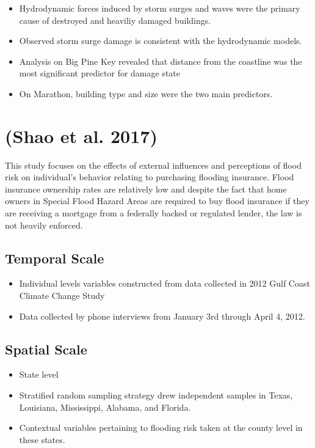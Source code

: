 \documentclass[
]{article}
\providecommand{\tightlist}{%
  \setlength{\itemsep}{0pt}\setlength{\parskip}{0pt}}
\begin{document}
\begin{itemize}
\tightlist
\item
  Hydrodynamic forces induced by storm surges and waves were the primary
  cause of destroyed and heaviliy damaged buildings.
\item
  Observed storm surge damage is consistent with the hydrodynamic
  models.
\item
  Analysis on Big Pine Key revealed that distance from the coastline was
  the most significant predictor for damage state
\item
  On Marathon, building type and size were the two main predictors.
\end{itemize}

\hypertarget{shao2017understanding}{%
\section{(Shao et al. 2017)}\label{shao2017understanding}}

This study focuses on the effects of external influences and perceptions
of flood risk on individual's behavior relating to purchasing flooding
insurance. Flood insurance ownership rates are relatively low and
despite the fact that home owners in Special Flood Hazard Areas are
required to buy flood insurance if they are receiving a mortgage from a
federally backed or regulated lender, the law is not heavily enforced.

\hypertarget{temporal-scale-26}{%
\subsection{Temporal Scale}\label{temporal-scale-26}}

\begin{itemize}
\tightlist
\item
  Individual levels variables constructed from data collected in 2012
  Gulf Coast Climate Change Study
\item
  Data collected by phone interviews from January 3rd through April 4,
  2012.
\end{itemize}

\hypertarget{spatial-scale-26}{%
\subsection{Spatial Scale}\label{spatial-scale-26}}

\begin{itemize}
\tightlist
\item
  State level
\item
  Stratified random sampling strategy drew independent samples in Texas,
  Louisiana, Mississippi, Alabama, and Florida.
\item
  Contextual variables pertaining to flooding risk taken at the county
  level in these states.
\end{itemize}
\end{document}
